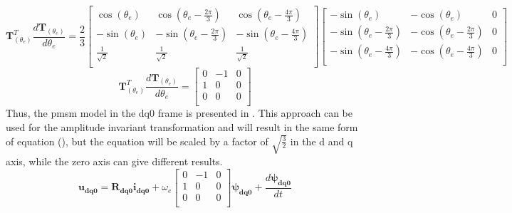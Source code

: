 \begin{equation}
	\label{eq:transformation_derivative_intermediary}
	\mathbf{T}^T_{(\theta_e)}\frac{d\mathbf{T}_{(\theta_e)}}{d\theta_e} = 	\frac{2}{3}
	\begin{bmatrix}
		\cos{\left(\theta_e\right)}  & \cos{\left(\theta_e-\frac{2\pi}{3}\right)}  & \cos{\left(\theta_e-\frac{4\pi}{3}\right)}  \\
		-\sin{\left(\theta_e\right)} & -\sin{\left(\theta_e-\frac{2\pi}{3}\right)} & -\sin{\left(\theta_e-\frac{4\pi}{3}\right)} \\
		\frac{1}{\sqrt{2}}           & \frac{1}{\sqrt{2}}                          & \frac{1}{\sqrt{2}}                          \\
	\end{bmatrix}
	\begin{bmatrix}
		-\sin{\left(\theta_e\right)}                & -\cos{\left(\theta_e\right)}                & 0 \\
		-\sin{\left(\theta_e-\frac{2\pi}{3}\right)} & -\cos{\left(\theta_e-\frac{2\pi}{3}\right)} & 0 \\
		-\sin{\left(\theta_e-\frac{4\pi}{3}\right)} & -\cos{\left(\theta_e-\frac{4\pi}{3}\right)} & 0 \\
	\end{bmatrix}
\end{equation}
\begin{equation}
	\label{eq:transformation_derivative}
	\mathbf{T}^T_{(\theta_e)}\frac{d\mathbf{T}_{(\theta_e)}}{d\theta_e} =
	\begin{bmatrix}
		0 & -1 & 0 \\
		1 & 0  & 0 \\
		0 & 0  & 0 \\
	\end{bmatrix}
\end{equation}
Thus, the \gls{pmsm} model in the dq0 frame is presented in . This approach can be used for the amplitude invariant transformation and will result in the same form of equation (), but the equation will be scaled by a factor of $\sqrt{\frac{3}{2}}$ in the d and q axis, while the zero axis can give different results.
\begin{equation}
	\mathbf{u_{dq0}}
	=
	\mathbf{R_{dq0}}\mathbf{i_{dq0}}
	+\omega_e	\begin{bmatrix}
		0 & -1 & 0 \\
		1 & 0  & 0 \\
		0 & 0  & 0 \\
	\end{bmatrix}
	\pmb{\psi_{dq0}}
	+\frac{d \pmb{\psi_{dq0}}}{dt}
	\label{eq:flx_voltage_balance_dq0}
\end{equation}

